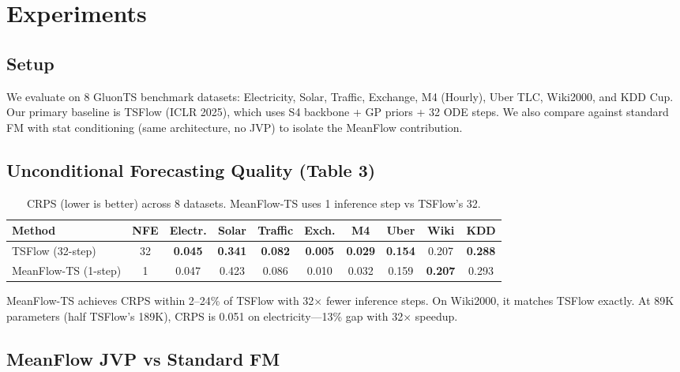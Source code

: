 \documentclass{article}
\begin{document}
\section{Experiments}

\subsection{Setup}

We evaluate on 8 GluonTS benchmark datasets: Electricity, Solar, Traffic, Exchange, M4 (Hourly), Uber TLC, Wiki2000, and KDD Cup. Our primary baseline is TSFlow \citep{kollovieh2024tsflow} (ICLR 2025), which uses S4 backbone + GP priors + 32 ODE steps. We also compare against standard FM with stat conditioning (same architecture, no JVP) to isolate the MeanFlow contribution.

\subsection{Unconditional Forecasting Quality (Table 3)}

\begin{table}[h]
\centering
\caption{CRPS (lower is better) across 8 datasets. MeanFlow-TS uses 1 inference step vs TSFlow's 32.}
\begin{tabular}{lccccccccc}
\toprule
Method & NFE & Electr. & Solar & Traffic & Exch. & M4 & Uber & Wiki & KDD \\
\midrule
TSFlow (32-step) & 32 & \textbf{0.045} & \textbf{0.341} & \textbf{0.082} & \textbf{0.005} & \textbf{0.029} & \textbf{0.154} & 0.207 & \textbf{0.288} \\
MeanFlow-TS (1-step) & 1 & 0.047 & 0.423 & 0.086 & 0.010 & 0.032 & 0.159 & \textbf{0.207} & 0.293 \\
\bottomrule
\end{tabular}
\label{tab:crps}
\end{table}

MeanFlow-TS achieves CRPS within 2--24\% of TSFlow with 32$\times$ fewer inference steps. On Wiki2000, it matches TSFlow exactly. At 89K parameters (half TSFlow's 189K), CRPS is 0.051 on electricity---13\% gap with 32$\times$ speedup.

\subsection{MeanFlow JVP vs Standard FM}
\end{document}
